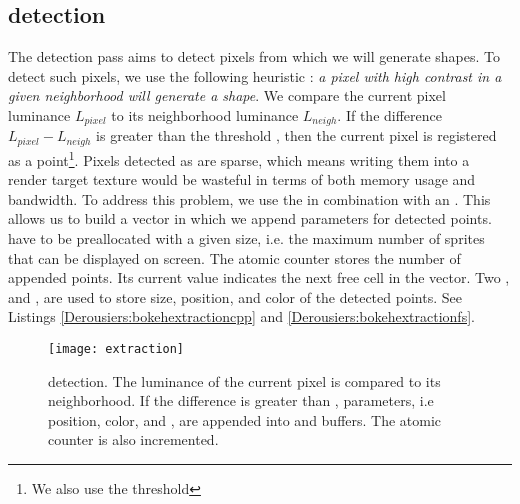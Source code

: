 \subsection{\Bokeh detection}
The detection pass aims to detect pixels from which we will generate \bokeh shapes. To detect such pixels, we use the following heuristic : \emph{a pixel with high contrast in a given neighborhood will generate a \bokeh shape}. We compare the current pixel luminance $L_{pixel}$ to its neighborhood luminance $L_{neigh}$. If the difference $L_{pixel}-L_{neigh}$ is greater than the threshold , then the current pixel is registered as a \bokeh point\footnote{We also use the threshold }. Pixels detected as \bokeh are sparse, which means writing them into a render target texture would be wasteful in terms of both memory usage and bandwidth. To address this problem, we use the \opengl {} in combination with an . This allows us to build a vector in which we append parameters for detected \bokeh points.  have to be preallocated with a given size, i.e. the maximum number of \bokeh sprites that can be displayed on screen. The atomic counter  stores the number of appended \bokeh points. Its current value indicates the next free cell in the  vector. Two ,  and , are used to store \coc size, position, and color of the detected \bokeh points. See Listings \ref{Derousiers:bokehextractioncpp} and \ref{Derousiers:bokehextractionfs}.

	\begin{figure}[htb]\centering
	\texttt{[image: extraction]}
	\caption{\Bokeh detection. The luminance of the current pixel is compared to its neighborhood. If the difference is greater than , \bokeh parameters, i.e position, color, and \coc, are appended into  and  buffers. The atomic counter  is also incremented.}
	\label{Derousiers:detection}
	\end{figure}

